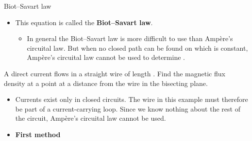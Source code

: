 \begin{ELimportant}{Biot--Savart law}


\end{ELimportant}

\begin{ELjoin}

\begin{itemize}
\tightlist
\item
  This equation is called the \textbf{Biot--Savart law}.

  \begin{itemize}
  \tightlist
  \item
    In general the Biot--Savart law is more difficult to use than Ampère's circuital law. But when no closed path can be found on which  is constant, Ampère's circuital law cannot be used to determine .
  \end{itemize}
\end{itemize}


\begin{ELexample}{}

A direct current  flows in a straight wire of length . Find the magnetic flux density at a point at a distance  from the wire in the bisecting plane.


\begin{ELsolution}

\begin{itemize}
\tightlist
\item
  Currents exist only in closed circuits. The wire in this example must therefore be part of a current-carrying loop. Since we know nothing about the rest of the circuit, Ampère's circuital law cannot be used.
\item
  \textbf{First method}
\end{itemize}


\end{ELsolution}
\end{ELexample}
\end{ELjoin}
